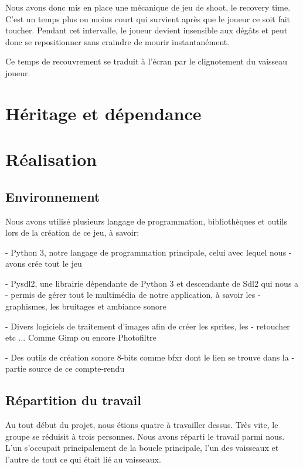 \documentclass{article}
\begin{document}
Nous avons donc mis en place une mécanique de jeu de shoot, le recovery time.
C'est un temps plus ou moins court qui survient après que le joueur ce soit fait
toucher. Pendant cet intervalle, le joueur devient insensible aux dégâts et peut
donc se repositionner sans craindre de mourir instantanément. \newline

Ce temps de recouvrement se traduit à l'écran par le clignotement du vaisseau
joueur. \newpage

\section{Héritage et dépendance}


\newpage

\section{Réalisation}
\subsection{Environnement}

Nous avons utilisé plusieurs langage de programmation, bibliothèques et outils
lors de la création de ce jeu, à savoir: \newline

- Python 3, notre langage de programmation principale, celui avec lequel nous
- avons crée tout le jeu \newline

- Pysdl2, une librairie dépendante de Python 3 et descendante de Sdl2 qui nous a
- permis de gérer tout le multimédia de notre application, à savoir les
- graphismes, les bruitages et ambiance sonore \newline

- Divers logiciels de traitement d'images afin de créer les sprites, les
- retoucher etc ... Comme Gimp ou encore Photofiltre \newline

- Des outils de création sonore 8-bits comme bfxr dont le lien se trouve dans la
- partie source de ce compte-rendu

\subsection{Répartition du travail}

Au tout début du projet, nous étions quatre à travailler dessus. Très vite, le
groupe se réduisit à trois personnes. Nous avons réparti le travail parmi nous.
L'un s'occupait principalement de la boucle principale, l'un des vaisseaux et
l'autre de tout ce qui était lié au vaisseaux. \newline
\end{document}
